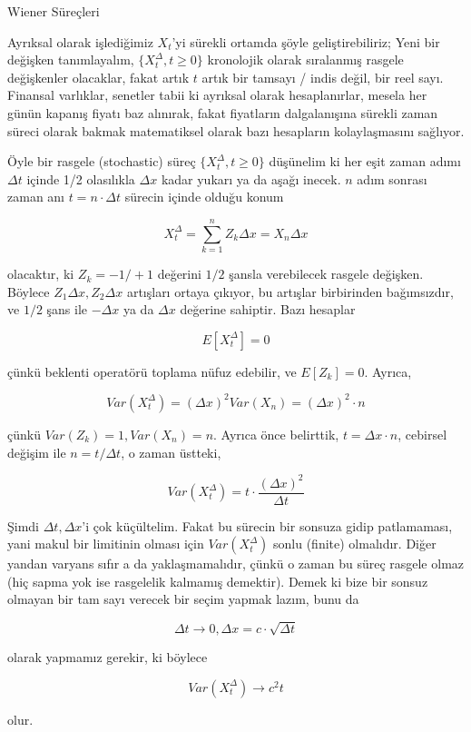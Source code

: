 \documentclass[12pt,fleqn]{article}\usepackage{../../common}
\begin{document}
Wiener Süreçleri 

Ayrıksal olarak işlediğimiz $X_t$'yi sürekli ortamda şöyle geliştirebiliriz;
Yeni bir değişken tanımlayalım, $\{ X_t^{\Delta}, t \ge 0 \}$ kronolojik olarak
sıralanmış rasgele değişkenler olacaklar, fakat artık $t$ artık bir tamsayı /
indis değil, bir reel sayı. Finansal varlıklar, senetler tabii ki ayrıksal
olarak hesaplanırlar, mesela her günün kapanış fiyatı baz alınırak, fakat
fiyatların dalgalanışına sürekli zaman süreci olarak bakmak matematiksel olarak
bazı hesapların kolaylaşmasını sağlıyor.

Öyle bir rasgele (stochastic) süreç $\{ X_t^{\Delta}, t \ge 0 \}$ düşünelim ki
her eşit zaman adımı $\Delta t$ içinde 1/2 olasılıkla $\Delta x$ kadar yukarı ya
da aşağı inecek. $n$ adım sonrası zaman anı $t = n \cdot \Delta t$ sürecin
içinde olduğu konum

$$ X_t^{\Delta} = \sum _{k=1}^{n} Z_k \Delta x = X_n \Delta x $$

olacaktır, ki $Z_k = -1/+1$ değerini $1/2$ şansla verebilecek rasgele
değişken. Böylece $Z_1 \Delta x,Z_2 \Delta x$ artışları ortaya çıkıyor, bu
artışlar birbirinden bağımsızdır, ve $1/2$ şans ile $-\Delta x$ ya da $\Delta x$
değerine sahiptir. Bazı hesaplar

$$ E[X_t^{\Delta}] = 0 $$

çünkü beklenti operatörü toplama nüfuz edebilir, ve $E[Z_k] = 0$. Ayrıca,

$$ Var(X_t^{\Delta}) = (\Delta x)^2 Var(X_n) =  (\Delta x)^2 \cdot n$$

çünkü $Var(Z_k) = 1,Var(X_n)=n$. Ayrıca önce belirttik, $t = \Delta x \cdot n$,
cebirsel değişim ile $n = t / \Delta t$, o zaman üstteki,

$$ Var(X_t^{\Delta}) = t \cdot \frac{(\Delta x)^2}{\Delta t}  $$

Şimdi $\Delta t,\Delta x$'i çok küçültelim. Fakat bu sürecin bir sonsuza gidip
patlamaması, yani makul bir limitinin olması için $Var(X_t^{\Delta})$ sonlu
(finite) olmalıdır. Diğer yandan varyans sıfır a da yaklaşmamalıdır, çünkü o
zaman bu süreç rasgele olmaz (hiç sapma yok ise rasgelelik kalmamış
demektir). Demek ki bize bir sonsuz olmayan bir tam sayı verecek bir seçim
yapmak lazım, bunu da

$$\Delta t \to 0, \Delta x = c \cdot \sqrt{\Delta t}$$

olarak yapmamız gerekir, ki böylece 

$$Var(X_t^{\Delta}) \to c^2t$$ 

olur. 
\end{document}
